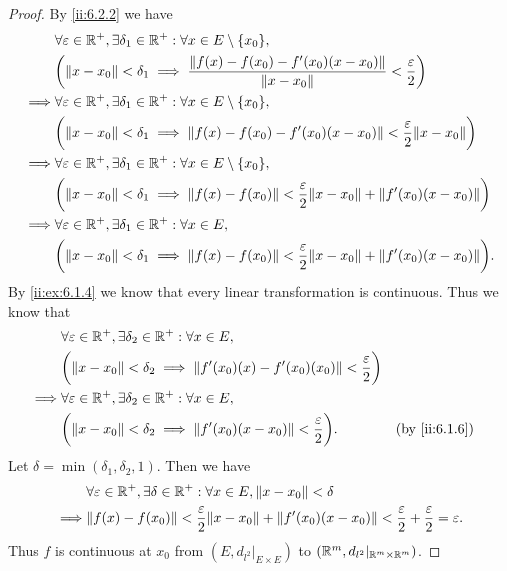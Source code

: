 \begin{proof}
  By \cref{ii:6.2.2} we have
  \begin{align*}
             & \forall \varepsilon \in \R^+, \exists \delta_1 \in \R^+ : \forall x \in E \setminus \set{x_0},                                             \\
             & \bigg(\norm*{x - x_0} < \delta_1 \implies \dfrac{\norm*{f(x) - f(x_0) - f'(x_0)(x - x_0)}}{\norm*{x - x_0}} < \dfrac{\varepsilon}{2}\bigg) \\
    \implies & \forall \varepsilon \in \R^+, \exists \delta_1 \in \R^+ : \forall x \in E \setminus \set{x_0},                                             \\
             & \bigg(\norm*{x - x_0} < \delta_1 \implies \norm*{f(x) - f(x_0) - f'(x_0)(x - x_0)} < \dfrac{\varepsilon}{2} \norm*{x - x_0}\bigg)          \\
    \implies & \forall \varepsilon \in \R^+, \exists \delta_1 \in \R^+ : \forall x \in E \setminus \set{x_0},                                             \\
             & \bigg(\norm*{x - x_0} < \delta_1 \implies \norm*{f(x) - f(x_0)} < \dfrac{\varepsilon}{2} \norm*{x - x_0} + \norm*{f'(x_0)(x - x_0)}\bigg)  \\
    \implies & \forall \varepsilon \in \R^+, \exists \delta_1 \in \R^+ : \forall x \in E,                                                                 \\
             & \bigg(\norm*{x - x_0} < \delta_1 \implies \norm*{f(x) - f(x_0)} < \dfrac{\varepsilon}{2} \norm*{x - x_0} + \norm*{f'(x_0)(x - x_0)}\bigg).
  \end{align*}
  By \cref{ii:ex:6.1.4} we know that every linear transformation is continuous.
  Thus we know that
  \begin{align*}
             & \forall \varepsilon \in \R^+, \exists \delta_2 \in \R^+ : \forall x \in E,                                                 \\
             & \bigg(\norm*{x - x_0} < \delta_2 \implies \norm*{f'(x_0)(x) - f'(x_0)(x_0)} < \dfrac{\varepsilon}{2}\bigg)                 \\
    \implies & \forall \varepsilon \in \R^+, \exists \delta_2 \in \R^+ : \forall x \in E,                                                 \\
             & \bigg(\norm*{x - x_0} < \delta_2 \implies \norm*{f'(x_0)(x - x_0)} < \dfrac{\varepsilon}{2}\bigg).         &  & \by{ii:6.1.6}
  \end{align*}
  Let \(\delta = \min(\delta_1, \delta_2, 1)\).
  Then we have
  \begin{align*}
             & \forall \varepsilon \in \R^+, \exists \delta \in \R^+ : \forall x \in E, \norm*{x - x_0} < \delta                                                          \\
    \implies & \norm*{f(x) - f(x_0)} < \dfrac{\varepsilon}{2} \norm*{x - x_0} + \norm*{f'(x_0)(x - x_0)} < \dfrac{\varepsilon}{2} + \dfrac{\varepsilon}{2} = \varepsilon.
  \end{align*}
  Thus \(f\) is continuous at \(x_0\) from \((E, d_{l^2}|_{E \times E})\) to \((\mathbb{R}^m, d_{l^2}|_{\mathbb{R}^m \times \mathbb{R}^m})\).
\end{proof}

